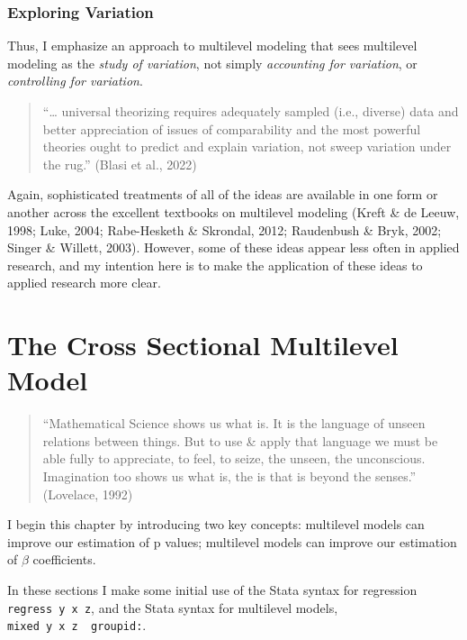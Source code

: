 \documentclass[
  letterpaper,
  DIV=11,
  numbers=noendperiod]{scrreprt}
\begin{document}
\hypertarget{exploring-variation}{%
\subsection{Exploring Variation}\label{exploring-variation}}

Thus, I emphasize an approach to multilevel modeling that sees
multilevel modeling as the \emph{study of variation}, not simply
\emph{accounting for variation}, or \emph{controlling for variation}.

\begin{quote}
``\ldots{} universal theorizing requires adequately sampled (i.e.,
diverse) data and better appreciation of issues of comparability and the
most powerful theories ought to predict and explain variation, not sweep
variation under the rug.'' (Blasi et al., 2022)
\end{quote}

Again, sophisticated treatments of all of the ideas are available in one
form or another across the excellent textbooks on multilevel modeling
(Kreft \& de Leeuw, 1998; Luke, 2004; Rabe-Hesketh \& Skrondal, 2012;
Raudenbush \& Bryk, 2002; Singer \& Willett, 2003). However, some of
these ideas appear less often in applied research, and my intention here
is to make the application of these ideas to applied research more
clear.


\hypertarget{the-cross-sectional-multilevel-model}{%
\chapter{The Cross Sectional Multilevel
Model}\label{the-cross-sectional-multilevel-model}}

\begin{quote}
``Mathematical Science shows us what is. It is the language of unseen
relations between things. But to use \& apply that language we must be
able fully to appreciate, to feel, to seize, the unseen, the
unconscious. Imagination too shows us what is, the is that is beyond the
senses.'' (Lovelace, 1992)
\end{quote}

I begin this chapter by introducing two key concepts: multilevel models
can improve our estimation of p values; multilevel models can improve
our estimation of \(\beta\) coefficients.

In these sections I make some initial use of the Stata syntax for
regression \texttt{regress\ y\ x\ z}, and the Stata syntax for
multilevel models,
\texttt{mixed\ y\ x\ z\ \textbar{}\textbar{}\ groupid:}.
\end{document}
